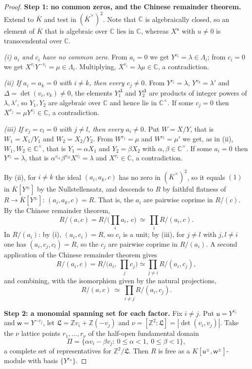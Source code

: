\documentclass[11pt,reqno]{amsart}
\theoremstyle{plain}
\theoremstyle{definition}
\theoremstyle{remark}
\theoremstyle{plain}
\theoremstyle{remark}
\theoremstyle{definition}
\numberwithin{equation}{section}
\newcommand{\Z}{\mathbb{Z}}
\newcommand{\C}{\mathbb{C}}
\newcommand{\su}{\mathsf{u}}
\newcommand{\sw}{\mathsf{w}}
\begin{document}
\begin{proof}
\textbf{Step 1: no common zeros, and the Chinese remainder theorem.}  Extend to
$\overline K$ and test in $(\overline K^\times)^2$.  Note that $\C$ is
algebraically closed, so an element of $\overline K$ that is algebraic over $\C$
lies in $\C$, whereas $X^{u}$ with $u\ne0$ is transcendental over $\C$.

\emph{(i) $a_i$ and $c_i$ have no common zero.}  From $a_i=0$ we get
$Y^{v_i}=\lambda\in\Lambda_i$; from $c_i=0$ we get
$X^{v_i}Y^{-v_i}=\mu\in\Lambda_i$.  Multiplying, $X^{v_i}=\lambda\mu\in\C$, a
contradiction.

\emph{(ii) If $a_i=a_k=0$ with $i\ne k$, then every $c_j\ne0$.}  From
$Y^{v_i}=\lambda$, $Y^{v_k}=\lambda'$ and $\Delta=\det(v_i,v_k)\ne0$, the
elements $Y_1^{\Delta}$ and $Y_2^{\Delta}$ are products of integer powers of
$\lambda,\lambda'$, so $Y_1,Y_2$ are algebraic over $\C$ and hence lie in
$\C^\times$.  If some $c_j=0$ then $X^{v_j}=\mu Y^{v_j}\in\C$, a contradiction.

\emph{(iii) If $c_j=c_l=0$ with $j\ne l$, then every $a_i\ne0$.}  Put $W=X/Y$,
that is $W_1=X_1/Y_1$ and $W_2=X_2/Y_2$.  From $W^{v_j}=\mu$ and
$W^{v_l}=\mu'$ we get, as in (ii), $W_1,W_2\in\C^\times$, that is
$Y_1=\alpha X_1$ and $Y_2=\beta X_2$ with $\alpha,\beta\in\C^\times$.  If some
$a_i=0$ then $Y^{v_i}=\lambda$, that is
$\alpha^{v_{i1}}\beta^{v_{i2}}X^{v_i}=\lambda$ and $X^{v_i}\in\C$, a
contradiction.

By (ii), for $i\ne k$ the ideal $(a_i,a_k,c)$ has no zero in
$(\overline K^\times)^2$, so it equals $(1)$ in $\overline K[Y^{\pm}]$ by the
Nullstellensatz, and descends to $R$ by faithful flatness of
$R\to\overline K[Y^\pm]$: $(a_i,a_k,c)=R$.  That is, the $a_i$ are pairwise
coprime in $R/(c)$.  By the Chinese remainder theorem,
\[R/(a,c)=R\big/\bigl(\textstyle\prod_ia_i,\ c\bigr)\ \simeq\ \prod_iR/(a_i,c).\]
In $R/(a_i)$: by (i), $(a_i,c_i)=R$, so $c_i$ is a unit; by (iii), for
$j\ne l$ with $j,l\ne i$ one has $(a_i,c_j,c_l)=R$, so the $c_j$ are pairwise
coprime in $R/(a_i)$.  A second application of the Chinese remainder theorem
gives
\[R/(a_i,c)=R\big/\bigl(a_i,\ \textstyle\prod_jc_j\bigr)
  \simeq\prod_{j\ne i}R/(a_i,c_j),\]
and combining, with the isomorphism given by the natural projections,
\begin{equation}
R/(a,c)\ \simeq\ \prod_{i\ne j}R/(a_i,c_j). \label{eq:CRT}
\end{equation}

\textbf{Step 2: a monomial spanning set for each factor.}  Fix $i\ne j$.  Put
$\su=Y^{v_i}$ and $\sw=Y^{-v_j}$, let
$\mathfrak L=\Z v_i+\Z(-v_j)$ and $\nu=[\Z^2:\mathfrak L]=|\det(v_i,v_j)|$.
Take the $\nu$ lattice points $r_1,\dots,r_\nu$ of the half-open fundamental
domain
\[\Pi=\{\alpha v_i-\beta v_j:\ 0\le\alpha<1,\ 0\le\beta<1\},\]
a complete set of representatives for $\Z^2/\mathfrak L$.  Then $R$ is free as a
$K[\su^{\pm},\sw^{\pm}]$-module with basis $\{Y^{r_n}\}$.


\end{proof}
\end{document}
